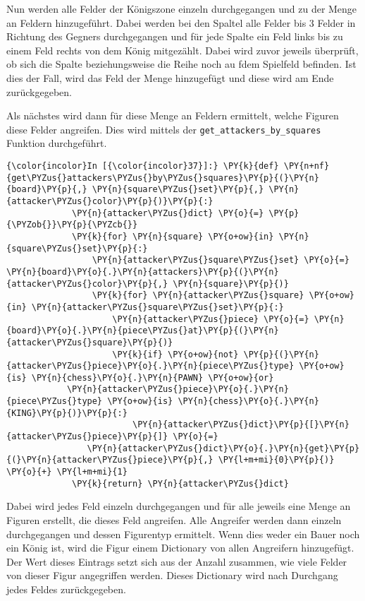     Nun werden alle Felder der Königszone einzeln durchgegangen und zu der
Menge an Feldern hinzugeführt. Dabei werden bei den Spaltel alle Felder
bis 3 Felder in Richtung des Gegners durchgegangen und für jede Spalte
ein Feld links bis zu einem Feld rechts von dem König mitgezählt. Dabei
wird zuvor jeweils überprüft, ob sich die Spalte beziehungsweise die
Reihe noch au fdem Spielfeld befinden. Ist dies der Fall, wird das Feld
der Menge hinzugefügt und diese wird am Ende zurückgegeben.

Als nächstes wird dann für diese Menge an Feldern ermittelt, welche
Figuren diese Felder angreifen. Dies wird mittels der
\texttt{get\_attackers\_by\_squares} Funktion durchgeführt.

    \begin{Verbatim}[commandchars=\\\{\}]
{\color{incolor}In [{\color{incolor}37}]:} \PY{k}{def} \PY{n+nf}{get\PYZus{}attackers\PYZus{}by\PYZus{}squares}\PY{p}{(}\PY{n}{board}\PY{p}{,} \PY{n}{square\PYZus{}set}\PY{p}{,} \PY{n}{attacker\PYZus{}color}\PY{p}{)}\PY{p}{:}
             \PY{n}{attacker\PYZus{}dict} \PY{o}{=} \PY{p}{\PYZob{}}\PY{p}{\PYZcb{}}
             \PY{k}{for} \PY{n}{square} \PY{o+ow}{in} \PY{n}{square\PYZus{}set}\PY{p}{:}
                 \PY{n}{attacker\PYZus{}square\PYZus{}set} \PY{o}{=} \PY{n}{board}\PY{o}{.}\PY{n}{attackers}\PY{p}{(}\PY{n}{attacker\PYZus{}color}\PY{p}{,} \PY{n}{square}\PY{p}{)}
                 \PY{k}{for} \PY{n}{attacker\PYZus{}square} \PY{o+ow}{in} \PY{n}{attacker\PYZus{}square\PYZus{}set}\PY{p}{:}
                     \PY{n}{attacker\PYZus{}piece} \PY{o}{=} \PY{n}{board}\PY{o}{.}\PY{n}{piece\PYZus{}at}\PY{p}{(}\PY{n}{attacker\PYZus{}square}\PY{p}{)}
                     \PY{k}{if} \PY{o+ow}{not} \PY{p}{(}\PY{n}{attacker\PYZus{}piece}\PY{o}{.}\PY{n}{piece\PYZus{}type} \PY{o+ow}{is} \PY{n}{chess}\PY{o}{.}\PY{n}{PAWN} \PY{o+ow}{or} 
			\PY{n}{attacker\PYZus{}piece}\PY{o}{.}\PY{n}{piece\PYZus{}type} \PY{o+ow}{is} \PY{n}{chess}\PY{o}{.}\PY{n}{KING}\PY{p}{)}\PY{p}{:}
                         \PY{n}{attacker\PYZus{}dict}\PY{p}{[}\PY{n}{attacker\PYZus{}piece}\PY{p}{]} \PY{o}{=} 
				\PY{n}{attacker\PYZus{}dict}\PY{o}{.}\PY{n}{get}\PY{p}{(}\PY{n}{attacker\PYZus{}piece}\PY{p}{,} \PY{l+m+mi}{0}\PY{p}{)} \PY{o}{+} \PY{l+m+mi}{1}
             \PY{k}{return} \PY{n}{attacker\PYZus{}dict}
\end{Verbatim}

    Dabei wird jedes Feld einzeln durchgegangen und für alle jeweils eine
Menge an Figuren erstellt, die dieses Feld angreifen. Alle Angreifer
werden dann einzeln durchgegangen und dessen Figurentyp ermittelt. Wenn
dies weder ein Bauer noch ein König ist, wird die Figur einem Dictionary
von allen Angreifern hinzugefügt. Der Wert dieses Eintrags setzt sich
aus der Anzahl zusammen, wie viele Felder von dieser Figur angegriffen
werden. Dieses Dictionary wird nach Durchgang jedes Feldes
zurückgegeben.

